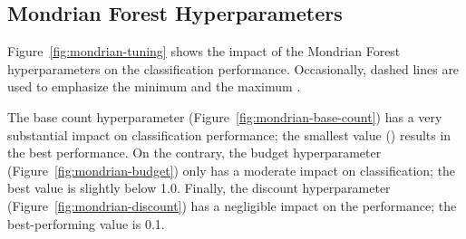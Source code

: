 \subsection{Mondrian Forest Hyperparameters}

Figure~\ref{fig:mondrian-tuning} shows the impact of the Mondrian Forest hyperparameters on
the classification performance. Occasionally, dashed lines are used to
emphasize the minimum and the maximum .

The base count hyperparameter (Figure~\ref{fig:mondrian-base-count}) has a
very substantial impact on classification performance; the smallest value
() results in the best performance. On the contrary, the
budget hyperparameter (Figure~\ref{fig:mondrian-budget}) only has a
moderate impact on classification; the best value is slightly below
1.0. Finally, the discount hyperparameter
(Figure~\ref{fig:mondrian-discount}) has a negligible impact on the
performance; the best-performing value is 0.1.


